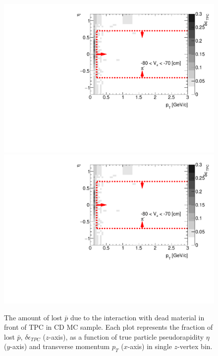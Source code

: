 \begin{figure}[H]
	\caption[The amount of lost $\bar{p}$ due to the interaction with dead material in front of TPC as a function of $p_T$, $\eta$ and $z$-vertex in CD]{The amount of lost $\bar{p}$ due to the interaction with dead material in front of TPC in CD MC sample. Each plot represents the fraction of lost $\bar{p}$, $\delta\epsilon_{ TPC}$ ($z$-axis), as a function of true particle pseudorapidity $\eta$ ($y$-axis) and transverse momentum $p_{T}$ ($x$-axis) in single $z$-vertex bin.}\label{fig:dead_materialCD3Dpbar}
	\parbox{0.325\textwidth}{
		\includegraphics[width=\linewidth,page=33]{graphics/systematicsEfficiency/deadMaterial/secondaries_Unbinned_CD_.pdf}\\
		\includegraphics[width=\linewidth,page=36]{graphics/systematicsEfficiency/deadMaterial/secondaries_Unbinned_CD_.pdf}\\
}
\end{figure}
